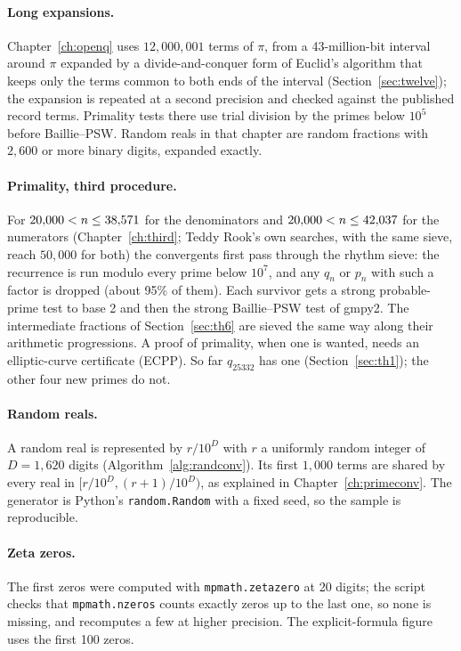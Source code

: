 \paragraph{Long expansions.} Chapter~\ref{ch:openq} uses $12{,}000{,}001$ terms of $\pi$, from a 43-million-bit interval around $\pi$ expanded by a divide-and-conquer form of Euclid's algorithm that keeps only the terms common to both ends of the interval (Section~\ref{sec:twelve}); the expansion is repeated at a second precision and checked against the published record terms. Primality tests there use trial division by the primes below $10^5$ before Baillie--PSW. Random reals in that chapter are random fractions with $2{,}600$ or more binary digits, expanded exactly. \addedon{\revA}

\paragraph{Primality, third procedure.} For $20{,}000 < n \le 38{,}571$ for the denominators and $20{,}000 < n \le 42{,}037$ for the numerators (Chapter~\ref{ch:third}; Teddy Rook's own searches, with the same sieve, reach $50{,}000$ for both) the convergents first pass through the rhythm sieve: the recurrence is run modulo every prime below $10^7$, and any $q_n$ or $p_n$ with such a factor is dropped (about 95\% of them). Each survivor gets a strong probable-prime test to base 2 and then the strong Baillie--PSW test of gmpy2. The intermediate fractions of Section~\ref{sec:th6} are sieved the same way along their arithmetic progressions. A proof of primality, when one is wanted, needs an elliptic-curve certificate (ECPP). \addedon{\revC} So far $q_{25332}$ has one (Section~\ref{sec:th1}); the other four new primes do not. \addedon{\revG}

\paragraph{Random reals.} A random real is represented by $r/10^D$ with $r$ a uniformly random integer of $D = 1{,}620$ digits (Algorithm~\ref{alg:randconv}). Its first $1{,}000$ terms are shared by every real in $[r/10^D, (r+1)/10^D)$, as explained in Chapter~\ref{ch:primeconv}. The generator is Python's \texttt{random.Random} with a fixed seed, so the sample is reproducible.

\paragraph{Zeta zeros.} The first \NZeros{} zeros were computed with \texttt{mpmath.zetazero} at 20 digits; the script checks that \texttt{mpmath.nzeros} counts exactly \NZeros{} zeros up to the last one, so none is missing, and recomputes a few at higher precision. The explicit-formula figure uses the first 100 zeros.

